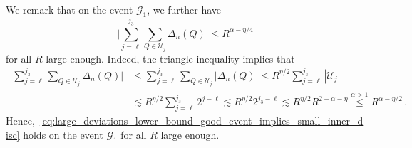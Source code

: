 \documentclass[11pt]{amsart}
\theoremstyle{definition}
\theoremstyle{remark}
\numberwithin{equation}{section}
\begin{document}
	We remark that on the event $\mathcal{G}_1$, we further have
	\begin{equation}
		\label{eq:large_deviations_lower_bound_good_event_implies_small_inner_disc}
		\Big|\sum_{j=\ell}^{j_3} \sum_{Q\in \mathcal{U}_j} \Delta_n(Q)\Big| \le R^{\alpha - \eta/4} 
	\end{equation}
	for all $R$ large enough. Indeed, the triangle inequality implies that
	\begin{align*}
		\Big|\sum_{j=\ell}^{j_3} \sum_{Q\in \mathcal{U}_j} \Delta_n(Q)\Big| &\le \sum_{j=\ell}^{j_3} \sum_{Q\in \mathcal{U}_j} \big|\Delta_n(Q)\big| \le R^{\eta/2} \sum_{j=\ell}^{j_3} |\mathcal{U}_j| \\ & \lesssim R^{\eta/2} \sum_{j=\ell}^{j_3} 2^{j-\ell} \lesssim R^{\eta/2} 2^{j_3-\ell} \lesssim R^{\eta/2} R^{2-\alpha-\eta}  \stackrel{\alpha>1}{\le} R^{\alpha-\eta/2} \, .
	\end{align*} 
	Hence,~\eqref{eq:large_deviations_lower_bound_good_event_implies_small_inner_disc} holds on the event $\mathcal{G}_1$ for all $R$ large enough.
\end{document}
